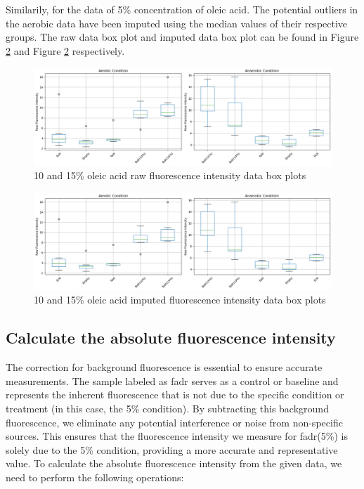\documentclass[UTF8]{article}
\begin{document}
Similarily, for the data of 5\% concentration of oleic acid. The potential outliers in the aerobic data have been imputed using the median values of their respective groups. The raw data box plot and imputed data box plot can be found in Figure \ref{fig:1015 oleic acid imputed data box plots} and Figure \ref{fig:1015 oleic acid imputed data box plots} respectively.

\begin{figure}[h]
	\centering
	\includegraphics[width=0.8\linewidth]{figures/rawCondition1015.png}
	\caption{10 and 15\% oleic acid raw fluorescence intensity data box plots}
	\label{fig:1015 oleic acid raw data box plots}
\end{figure}

\begin{figure}[h]
	\centering
	\includegraphics[width=0.8\linewidth]{figures/rawCondition1015.png}
	\caption{10 and 15\% oleic acid imputed fluorescence intensity data box plots}
	\label{fig:1015 oleic acid imputed data box plots}
\end{figure}

\subsection{Calculate the absolute fluorescence intensity}

The correction for background fluorescence is essential to ensure accurate measurements. The sample labeled as fadr serves as a control or baseline and represents the inherent fluorescence that is not due to the specific condition or treatment (in this case, the 5\% condition). By subtracting this background fluorescence, we eliminate any potential interference or noise from non-specific sources. This ensures that the fluorescence intensity we measure for fadr(5\%) is solely due to the 5\% condition, providing a more accurate and representative value.
To calculate the absolute fluorescence intensity from the given data, we need to perform the following operations:
\end{document}
